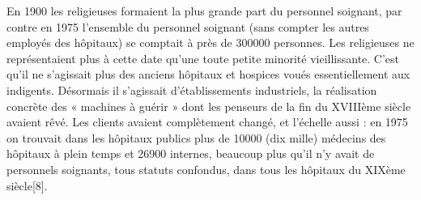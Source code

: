  En 1900 les religieuses formaient la plus grande part du personnel soignant, par contre en 1975 l'ensemble du personnel soignant (sans compter les autres employés des hôpitaux) se comptait à près de 300000 personnes. Les religieuses ne représentaient plus à cette date qu'une toute petite minorité vieillissante. C'est qu'il ne s'agissait plus des anciens hôpitaux et hospices voués essentiellement aux indigents. Désormais il s'agissait d'établissements industriels, la réalisation concrète des « machines à guérir » dont les penseurs de la fin du XVIIIème siècle avaient rêvé. Les clients avaient complètement changé, et l'échelle aussi : en 1975 on trouvait dans les hôpitaux publics plus de 10000 (dix mille) médecins des hôpitaux à plein temps et 26900 internes, beaucoup plus qu'il n'y avait de personnels soignants, tous statuts confondus, dans tous les hôpitaux du XIXème siècle[8].
 
